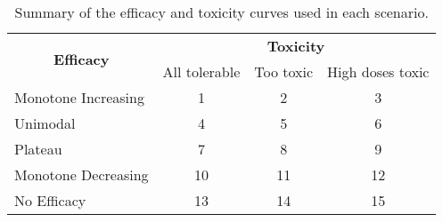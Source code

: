 \begin{table}[h!]
	\centering
	\caption{Summary of the efficacy and toxicity curves used in each scenario. }
	\label{tab_wt:sim-scenarios}
	\begin{tabular}{l|ccc}
		\hline
		\multicolumn{1}{c|}{\multirow{2}{*}{\textbf{Efficacy}}} & \multicolumn{3}{c}{\textbf{Toxicity}} \\
		\multicolumn{1}{c|}{} & All tolerable & Too toxic & High doses toxic \\ \hline
		Monotone Increasing & 1 & 2 & 3 \\
		Unimodal & 4 & 5 & 6 \\
		Plateau & 7 & 8 & 9 \\
		Monotone Decreasing & 10 & 11 & 12 \\
		No Efficacy & 13 & 14 & 15 \\ \hline
	\end{tabular}
\end{table}

